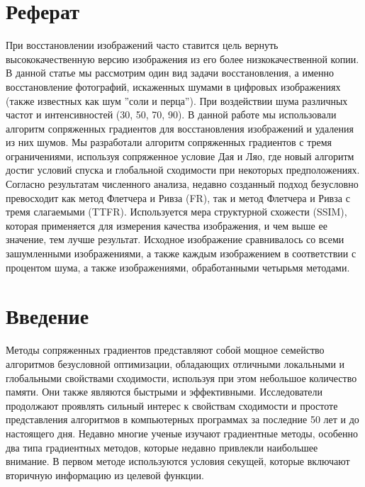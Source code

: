



\makeatletter
\newcommand{\stackover}{\genfrac{.}{.}\z@{}}
\makeatother




\tableofcontents
\newpage

\section*{Реферат}

При восстановлении изображений часто ставится цель вернуть высококачественную
версию изображения из его более низкокачественной копии. В данной статье мы
рассмотрим один вид задачи восстановления, а именно восстановление фотографий,
искаженных шумами в цифровых изображениях (также известных как шум ''соли и перца'').
При воздействии шума различных частот и интенсивностей (30, 50, 70, 90).
В данной работе мы использовали алгоритм сопряженных градиентов для
восстановления изображений и удаления из них шумов. Мы разработали алгоритм
сопряженных градиентов с тремя ограничениями, используя сопряженное условие Дая
и Ляо, где новый алгоритм достиг условий спуска и глобальной сходимости при
некоторых предположениях. Согласно результатам численного анализа, недавно
созданный подход безусловно превосходит как метод Флетчера и Ривза (FR), так и
метод Флетчера и Ривза с тремя слагаемыми (TTFR). Используется мера структурной
схожести (SSIM), которая применяется для измерения качества изображения, и чем
выше ее значение, тем лучше результат. Исходное изображение сравнивалось со
всеми зашумленными изображениями, а также каждым изображением в соответствии с
процентом шума, а также изображениями, обработанными четырьмя методами.

\section{Введение}

Методы сопряженных градиентов представляют собой мощное семейство алгоритмов
безусловной оптимизации, обладающих отличными локальными и глобальными
свойствами сходимости, используя при этом небольшое количество памяти. Они также
являются быстрыми и эффективными. Исследователи продолжают проявлять сильный
интерес к свойствам сходимости и простоте представления алгоритмов в
компьютерных программах за последние 50 лет и до настоящего дня. Недавно многие
ученые изучают градиентные методы, особенно два типа градиентных методов,
которые недавно привлекли наибольшее внимание. В первом методе используются
условия секущей, которые включают вторичную информацию из целевой функции.

